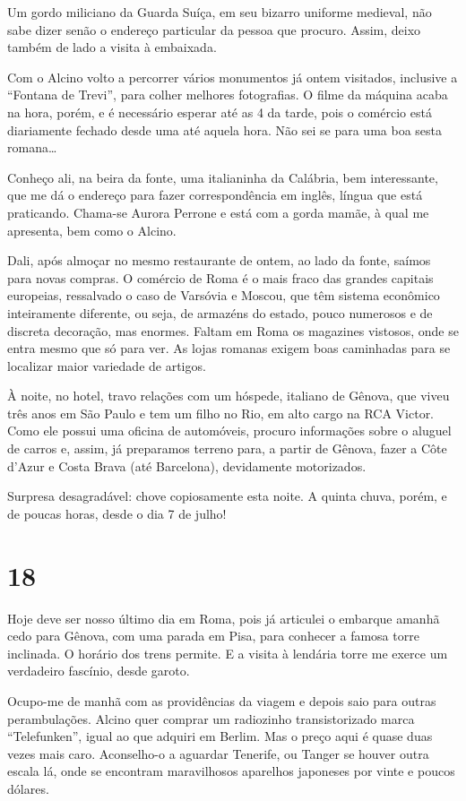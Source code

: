 Um gordo miliciano da Guarda Suíça, em seu bizarro uniforme medieval, não sabe dizer senão o endereço particular da pessoa que procuro. Assim, deixo também de lado a visita à embaixada.

Com o Alcino volto a percorrer vários monumentos já ontem visitados, inclusive a “Fontana de Trevi”, para colher melhores fotografias. O filme da máquina acaba na hora, porém, e é necessário esperar até as 4 da tarde, pois o comércio está diariamente fechado desde uma até aquela hora. Não sei se para uma boa sesta romana\ldots

Conheço ali, na beira da fonte, uma italianinha da Calábria, bem interessante, que me dá o endereço para fazer correspondência em inglês, língua que está praticando. Chama-se Aurora Perrone e está com a gorda mamãe, à qual me apresenta, bem como o Alcino.

Dali, após almoçar no mesmo restaurante de ontem, ao lado da fonte, saímos para novas compras. O comércio de Roma é o mais fraco das grandes capitais europeias, ressalvado o caso de Varsóvia e Moscou, que têm sistema econômico inteiramente diferente, ou seja, de armazéns do estado, pouco numerosos e de discreta decoração, mas enormes. Faltam em Roma os magazines vistosos, onde se entra mesmo que só para ver. As lojas romanas exigem boas caminhadas para se localizar maior variedade de artigos.

À noite, no hotel, travo relações com um hóspede, italiano de Gênova, que viveu três anos em São Paulo e tem um filho no Rio, em alto cargo na RCA Victor. Como ele possui uma oficina de automóveis, procuro informações sobre o aluguel de carros e, assim, já preparamos terreno para, a partir de Gênova, fazer a Côte d’Azur e Costa Brava (até Barcelona), devidamente motorizados.

Surpresa desagradável: chove copiosamente esta noite. A quinta chuva, porém, e de poucas horas, desde o dia 7 de julho!

\section*{18 \adfflatleafright {}}
Hoje deve ser nosso último dia em Roma, pois já articulei o embarque amanhã cedo para Gênova, com uma parada em Pisa, para conhecer a famosa torre inclinada. O horário dos trens permite. E a visita à lendária torre me exerce um verdadeiro fascínio, desde garoto.

Ocupo-me de manhã com as providências da viagem e depois saio para outras perambulações. Alcino quer comprar um radiozinho transistorizado marca “Telefunken”, igual ao que adquiri em Berlim. Mas o preço aqui é quase duas vezes mais caro. Aconselho-o a aguardar Tenerife, ou Tanger se houver outra escala lá, onde se encontram maravilhosos aparelhos japoneses por vinte e poucos dólares.

